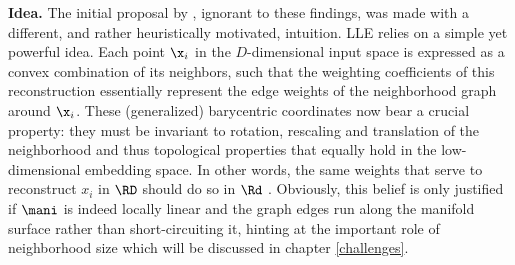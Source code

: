 \textbf{Idea.}
The initial proposal by \citet{roweissaul2000}, ignorant to these findings, 
was made with a different, and rather heuristically motivated, intuition.
LLE relies on a simple yet powerful idea.
Each point $\x_i$ in the $D$-dimensional input space is expressed as a convex 
combination of its neighbors, such that the weighting coefficients of this 
reconstruction essentially represent the edge weights of the neighborhood graph around $\x_i$. 
These (generalized) barycentric coordinates now bear a crucial property: they 
must be invariant to rotation, rescaling and translation of the neighborhood and 
thus topological properties that equally hold in the low-dimensional embedding 
space. 
In other words, the same weights that serve to reconstruct $x_i$ in $\RD$ should 
do so in $\Rd$ \citep{roweissaul2000}.
Obviously, this belief is only justified if $\mani$ is indeed locally linear and 
the graph edges run along the manifold surface rather than short-circuiting it, 
hinting at the important role of neighborhood size which will be discussed 
in chapter \ref{challenges}.

